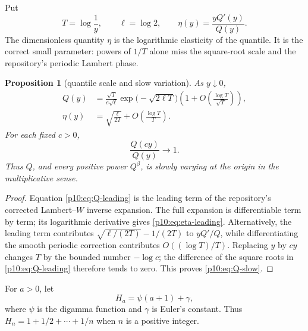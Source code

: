 \documentclass[11pt,oneside]{article}
\newtheorem{proposition}[theorem]{Proposition}
\theoremstyle{definition}
\theoremstyle{remark}
\newcommand{\Q}{Q}
\newcommand{\1}{\mathbf 1}
\begin{document}
Put
\begin{equation}\label{p10:eq:T-eta-def}
 T=\log\frac1y,
 \qquad \ell=\log2,
 \qquad
 \eta(y)=\frac{y\Q'(y)}{\Q(y)}.
\end{equation}
The dimensionless quantity \(\eta\) is the logarithmic elasticity of the quantile.  It
is the correct small parameter: powers of \(1/T\) alone miss the square-root scale and
the repository's periodic Lambert phase.

\begin{proposition}[quantile scale and slow variation]\label{p10:prop:Q-slow-variation}
As \(y\downarrow0\),
\begin{align}
 \Q(y)
 &=\frac{\sqrt T}{e\sqrt\ell}
   \exp\!\bigl(-\sqrt{2\ell T}\bigr)
   \left(1+O\!\left(\frac{\log T}{\sqrt T}\right)\right),
 \label{p10:eq:Q-leading}\\
 \eta(y)
 &=\sqrt{\frac{\ell}{2T}}
   +O\!\left(\frac{\log T}{T}\right).
 \label{p10:eq:eta-leading}
\end{align}
For each fixed \(c>0\),
\begin{equation}\label{p10:eq:Q-slow}
 \frac{\Q(cy)}{\Q(y)}\longrightarrow1.
\end{equation}
Thus \(\Q\), and every positive power \(\Q^\beta\), is slowly varying at the
origin in the multiplicative sense.
\end{proposition}

\begin{proof}
Equation \eqref{p10:eq:Q-leading} is the leading term of the repository's corrected
Lambert--\(W\) inverse expansion.  The full expansion is differentiable term by term;
its logarithmic derivative gives \eqref{p10:eq:eta-leading}.  Alternatively, the leading
term contributes
\(
 \sqrt{\ell/(2T)}-1/(2T)
\)
to \(y\Q'/\Q\), while differentiating the smooth periodic correction contributes
\(O((\log T)/T)\).  Replacing \(y\) by \(cy\) changes \(T\) by the bounded number
\(-\log c\); the difference of the square roots in \eqref{p10:eq:Q-leading} therefore tends
to zero.  This proves \eqref{p10:eq:Q-slow}.
\end{proof}

For \(a>0\), let
\begin{equation}\label{p10:eq:continuous-harmonic}
 H_a=\psi(a+1)+\gamma,
\end{equation}
where \(\psi\) is the digamma function and \(\gamma\) is Euler's constant.  Thus
\(H_n=1+1/2+\cdots+1/n\) when \(n\) is a positive integer.
\end{document}
